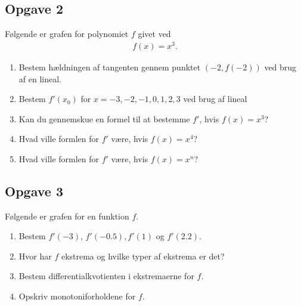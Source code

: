 \newpage
\subsection*{Opgave 2}

Følgende er grafen for polynomiet $f$ givet ved
\begin{align*}
	f(x) = x^3.
\end{align*}
\begin{center}
\end{center}
	
\begin{enumerate}[label=\roman*)]
	\item Bestem hældningen af tangenten gennem punktet $(-2,f(-2))$ ved brug af en lineal. 
	\item Bestem $f'(x_0)$ for $x=-3,-2,-1,0,1,2,3$ ved brug af lineal
	\item Kan du gennemskue en formel til at bestemme $f'$, hvis $f(x) = x^3$?
	\item Hvad ville formlen for $f'$ være, hvis $f(x) = x^4$?
	\item Hvad ville formlen for $f'$ være, hvis $f(x) = x^n$?
\end{enumerate}

\newpage
\subsection*{Opgave 3}
Følgende er grafen for en funktion $f$.
\begin{center}
\end{center}
\begin{enumerate}[label=\roman*)]
	\item Bestem $f'(-3)$, $f'(-0.5), f'(1)$ og $f'(2.2)$.
	\item Hvor har $f$ ekstrema og hvilke typer af ekstrema er det?
	\item Bestem differentialkvotienten i ekstremaerne for $f$.
	\item Opskriv monotoniforholdene for $f$. 
\end{enumerate}

